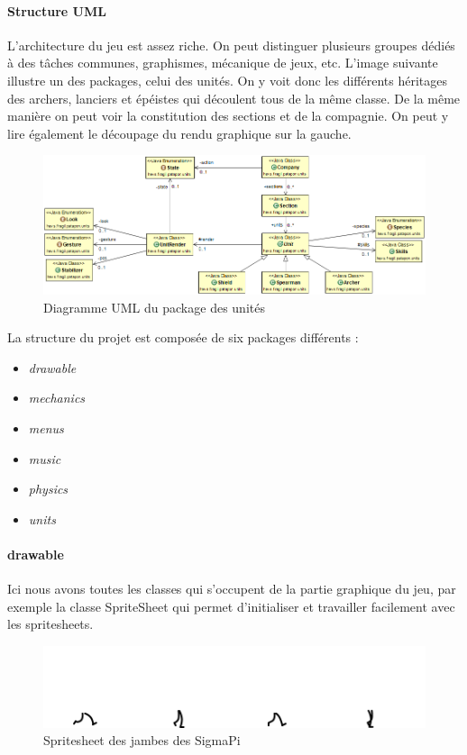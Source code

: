 \documentclass[a4paper,10pt]{article}
\begin{document}
  \paragraph*{Structure UML}
  L'architecture du jeu est assez riche. On peut distinguer plusieurs groupes dédiés à des tâches communes, graphismes, mécanique de jeux, etc.
  \newline L'image suivante illustre un des packages, celui des unités. On y voit donc les différents héritages des archers, lanciers et épéistes qui découlent tous de la même classe. De la même manière on peut voir la constitution des sections et de la compagnie.
  \newline On peut y lire également le découpage du rendu graphique sur la gauche.
  \begin{figure}[!h]
 \centering
 \vspace{-1pt}
 \includegraphics[scale=0.4]{images/units}
 \caption{Diagramme UML du package des unités}
 \end{figure}
  \newline La structure du projet est composée de six packages différents :\begin{itemize}
  \item {\itshape drawable}
  \item {\itshape mechanics}
  \item {\itshape menus}
  \item {\itshape music}
  \item {\itshape physics}
  \item {\itshape units}
  \end{itemize}
  \paragraph{drawable}
  Ici nous avons toutes les classes qui s'occupent de la partie graphique du jeu, par exemple la classe SpriteSheet qui permet d'initialiser et travailler facilement avec les spritesheets.
 \begin{figure}[!h]
 \centering
 \vspace{-45pt}
 \includegraphics[scale=0.3]{images/legs}
 \caption{Spritesheet des jambes des SigmaPi}
 \end{figure}
\end{document}
